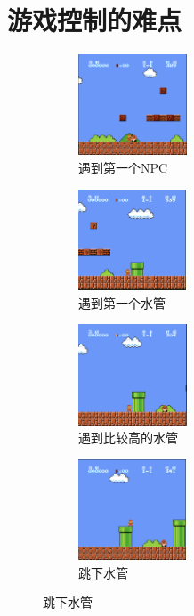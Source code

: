 \section{游戏控制的难点}
\begin{figure}[!htp]
  \centering
  \begin{subfigure}{3cm}
      \centering
      \includegraphics[height=3cm]{static/a.png}
      \caption{遇到第一个NPC}
  \end{subfigure}
  \hspace{1em}
  \begin{subfigure}{3cm}
    \centering
    \includegraphics[height=3cm]{static/b.png}
    \caption{遇到第一个水管}
  \end{subfigure}
  \hspace{1em}
  \begin{subfigure}{3cm}
    \centering
    \includegraphics[height=3cm]{static/c.png}
    \caption{遇到比较高的水管}
  \end{subfigure}
  \hspace{1em}
  \begin{subfigure}{3cm}
    \centering
    \includegraphics[height=3cm]{static/d.png}
    \caption{跳下水管}
  \end{subfigure}


\end{figure}
